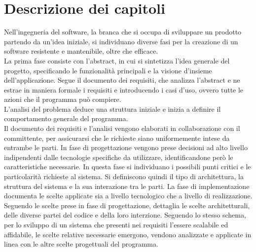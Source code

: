 \clearpage
{}
\section*{Descrizione dei capitoli}

Nell'ingegneria del software, la branca che si occupa di sviluppare un prodotto partendo da un'idea iniziale, 
si individuano diverse fasi per la creazione di un software resistente e mantenibile, oltre che efficace.\\

    La prima fase consiste con l'abstract, in cui si sintetizza l'idea generale del progetto, 
    specificando le funzionalità principali e la visione d'insieme dell'applicazione.
    Segue il documento dei requisiti, che analizza l'abstract e ne estrae in maniera formale i requisiti e introducendo i casi d'uso, 
    ovvero tutte le azioni che il programma può compiere.\\
    L'analisi del problema deduce una struttura iniziale e inizia a definire il comportamento generale del programma.\\
    Il documento dei requisiti e l'analisi vengono elaborati in collaborazione con il committente, 
    per assicurarsi che le richieste siano uniformemente intese da entrambe le parti.
    In fase di progettazione vengono prese decisioni ad alto livello indipendenti dalle tecnologie specifiche da utilizzare, 
    identificandone però le caratteristiche necessarie. 
    In questa fase si individuano i possibili punti critici e le particolarità richieste al sistema.
    Si definiscono quindi il tipo di architettura, la struttura del sistema e la sua interazione tra le parti.
    La fase di implementazione documenta le scelte applicate sia a livello tecnologico che a livello di realizzazione. 
    Seguendo le scelte prese in fase di progettazione, dettaglia le scelte architetturali, delle diverse partei del codice e della loro interzione.
Seguendo lo stesso schema, per lo sviluppo di un sistema che presenti nei requisiti l'essere scalabile ed affidabile, 
le scelte relative necessarie emergono, vendono analizzate e applicate in linea con le altre scelte progettuali del programma.\\
\clearpage